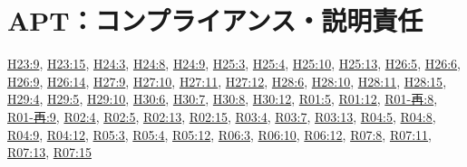 \section{APT：コンプライアンス・説明責任}
\hyperref[q:h23-reg-apt-09]{H23:9}, \hyperref[q:h23-reg-apt-15]{H23:15}, \hyperref[q:h24-reg-apt-03]{H24:3}, \hyperref[q:h24-reg-apt-08]{H24:8}, \hyperref[q:h24-reg-apt-09]{H24:9}, \hyperref[q:h25-reg-apt-03]{H25:3}, \hyperref[q:h25-reg-apt-04]{H25:4}, \hyperref[q:h25-reg-apt-10]{H25:10}, \hyperref[q:h25-reg-apt-13]{H25:13}, \hyperref[q:h26-reg-apt-05]{H26:5}, \hyperref[q:h26-reg-apt-06]{H26:6}, \hyperref[q:h26-reg-apt-09]{H26:9}, \hyperref[q:h26-reg-apt-14]{H26:14}, \hyperref[q:h27-reg-apt-09]{H27:9}, \hyperref[q:h27-reg-apt-10]{H27:10}, \hyperref[q:h27-reg-apt-11]{H27:11}, \hyperref[q:h27-reg-apt-12]{H27:12}, \hyperref[q:h28-reg-apt-06]{H28:6}, \hyperref[q:h28-reg-apt-10]{H28:10}, \hyperref[q:h28-reg-apt-11]{H28:11}, \hyperref[q:h28-reg-apt-15]{H28:15}, \hyperref[q:h29-reg-apt-04]{H29:4}, \hyperref[q:h29-reg-apt-05]{H29:5}, \hyperref[q:h29-reg-apt-10]{H29:10}, \hyperref[q:h30-reg-apt-06]{H30:6}, \hyperref[q:h30-reg-apt-07]{H30:7}, \hyperref[q:h30-reg-apt-08]{H30:8}, \hyperref[q:h30-reg-apt-12]{H30:12}, \hyperref[q:r01-reg-apt-05]{R01:5}, \hyperref[q:r01-reg-apt-12]{R01:12}, \hyperref[q:r01-ret-apt-08]{R01-再:8}, \hyperref[q:r01-ret-apt-09]{R01-再:9}, \hyperref[q:r02-reg-apt-04]{R02:4}, \hyperref[q:r02-reg-apt-05]{R02:5}, \hyperref[q:r02-reg-apt-13]{R02:13}, \hyperref[q:r02-reg-apt-15]{R02:15}, \hyperref[q:r03-reg-apt-04]{R03:4}, \hyperref[q:r03-reg-apt-07]{R03:7}, \hyperref[q:r03-reg-apt-13]{R03:13}, \hyperref[q:r04-reg-apt-05]{R04:5}, \hyperref[q:r04-reg-apt-08]{R04:8}, \hyperref[q:r04-reg-apt-09]{R04:9}, \hyperref[q:r04-reg-apt-12]{R04:12}, \hyperref[q:r05-reg-apt-03]{R05:3}, \hyperref[q:r05-reg-apt-04]{R05:4}, \hyperref[q:r05-reg-apt-12]{R05:12}, \hyperref[q:r06-reg-apt-03]{R06:3}, \hyperref[q:r06-reg-apt-10]{R06:10}, \hyperref[q:r06-reg-apt-12]{R06:12}, \hyperref[q:r07-reg-apt-08]{R07:8}, \hyperref[q:r07-reg-apt-11]{R07:11}, \hyperref[q:r07-reg-apt-13]{R07:13}, \hyperref[q:r07-reg-apt-15]{R07:15}
